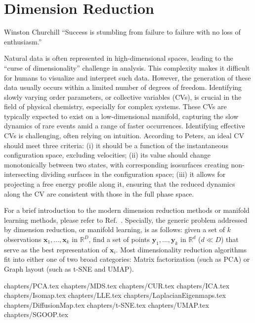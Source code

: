 \chapter{Dimension Reduction\label{chapter:DR}}
\begin{chapquote}{Winston Churchill%
	}
	``Success is stumbling from failure to failure with no loss of enthusiasm.''
\end{chapquote}

Natural data is often represented in high-dimensional spaces, leading to the ``curse of dimensionality'' challenge in analysis. This complexity makes it difficult for humans to visualize and interpret such data. However, the generation of these data usually occurs within a limited number of degrees of freedom. Identifying slowly varying order parameters, or collective variables (CVs), is crucial in the field of physical chemistry, especially for complex systems. These CVs are typically expected to exist on a low-dimensional manifold, capturing the slow dynamics of rare events amid a range of faster occurrences. Identifying effective CVs is challenging, often relying on intuition. According to Peters\cite{PetersARPC2016}, an ideal CV should meet three criteria: (i) it should be a function of the instantaneous configuration space, excluding velocities; (ii) its value should change monotonically between two states, with corresponding isosurfaces creating non-intersecting dividing surfaces in the configuration space; (iii) it allows for projecting a free energy profile along it, ensuring that the reduced dynamics along the CV are consistent with those in the full phase space.

For a brief introduction to the modern dimension reduction methods or manifold learning methods, please refer to Ref.~\cite{IzamanWIREsCS2012}. Specially, the generic problem addressed by dimension reduction, or manifold learning, is as follows: given a set of $k$ observations $\mathbf{x}_1,\dots,\mathbf{x}_k$ in $\mathbb{R}^D$, find a set of points $\mathbf{y}_1,\dots,\mathbf{y}_k$ in $\mathbb{R}^d$ ($d\ll D$) that serve as the best representation of $\mathbf{x}_i$. Most dimensionality reduction algorithms fit into either one of two broad categories: Matrix factorization (such as PCA) or Graph layout (such as t-SNE and UMAP).

\clearpage 
 {chapters/PCA.tex}
\clearpage
 {chapters/MDS.tex}
\clearpage
 {chapters/CUR.tex}
\clearpage
 {chapters/ICA.tex}
\clearpage
 {chapters/Isomap.tex}
\clearpage
 {chapters/LLE.tex}
\clearpage
 {chapters/LaplacianEigenmaps.tex}
\clearpage
 {chapters/DiffusionMap.tex}
\clearpage
 {chapters/t-SNE.tex}
\clearpage
 {chapters/UMAP.tex}
\clearpage
 {chapters/SGOOP.tex}